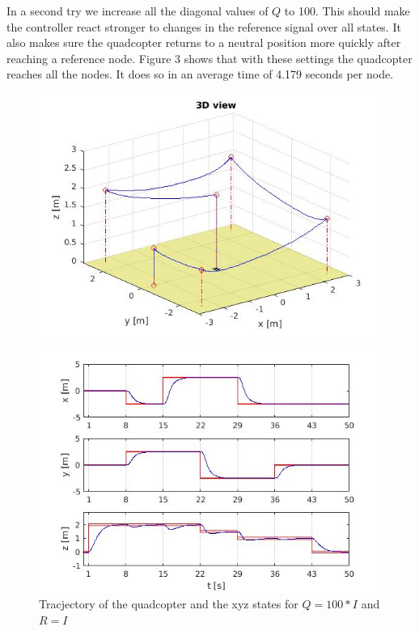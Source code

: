 \documentclass[]{article}
\begin{document}
In a second try we increase all the diagonal values of $Q$ to 100. This should make the controller react stronger to changes in the reference signal over all states. It also makes sure the quadcopter returns to a neutral position more quickly after reaching a reference node. Figure 3 shows that with these settings the quadcopter reaches all the nodes. It does so in an average time of 4.179 seconds per node. 

\begin{figure}[H]
\begin{minipage}{.5\textwidth}
\includegraphics[width=\textwidth]{trajectory2.jpg}
\end{minipage}%
\begin{minipage}{.5\textwidth}
\includegraphics[width=\textwidth]{xyz2.jpg}
\end{minipage}
\caption{Tracjectory of the quadcopter and the xyz states for $Q = 100*I$ and $R = I$}
\end{figure}
\end{document}
